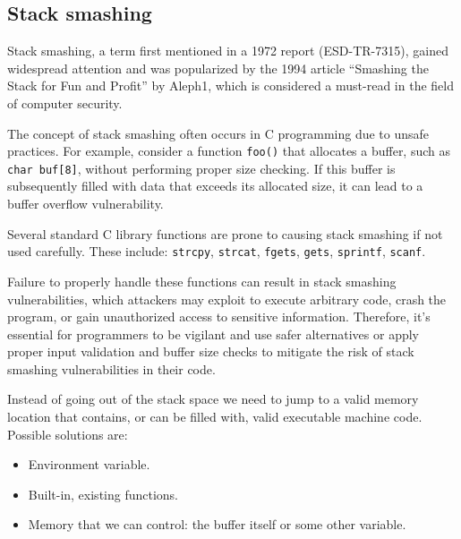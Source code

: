 \subsection{Stack smashing}
Stack smashing, a term first mentioned in a 1972 report (ESD-TR-7315), gained widespread attention and was popularized by the 1994 article ``Smashing the Stack for Fun and Profit'' by Aleph1, which is considered a must-read in the field of computer security.

The concept of stack smashing often occurs in C programming due to unsafe practices. 
For example, consider a function \texttt{foo()} that allocates a buffer, such as \texttt{char buf[8]}, without performing proper size checking. 
If this buffer is subsequently filled with data that exceeds its allocated size, it can lead to a buffer overflow vulnerability.

Several standard C library functions are prone to causing stack smashing if not used carefully. 
These include: \texttt{strcpy}, \texttt{strcat}, \texttt{fgets}, \texttt{gets}, \texttt{sprintf}, \texttt{scanf}.

Failure to properly handle these functions can result in stack smashing vulnerabilities, which attackers may exploit to execute arbitrary code, crash the program, or gain unauthorized access to sensitive information. 
Therefore, it's essential for programmers to be vigilant and use safer alternatives or apply proper input validation and buffer size checks to mitigate the risk of stack smashing vulnerabilities in their code.

Instead of going out of the stack space we need to jump to a valid memory
location that contains, or can be filled with,
valid executable machine code. 
Possible solutions are: 
\begin{itemize}
    \item Environment variable.
    \item Built-in, existing functions.
    \item Memory that we can control: the buffer itself or some other variable.
\end{itemize}

